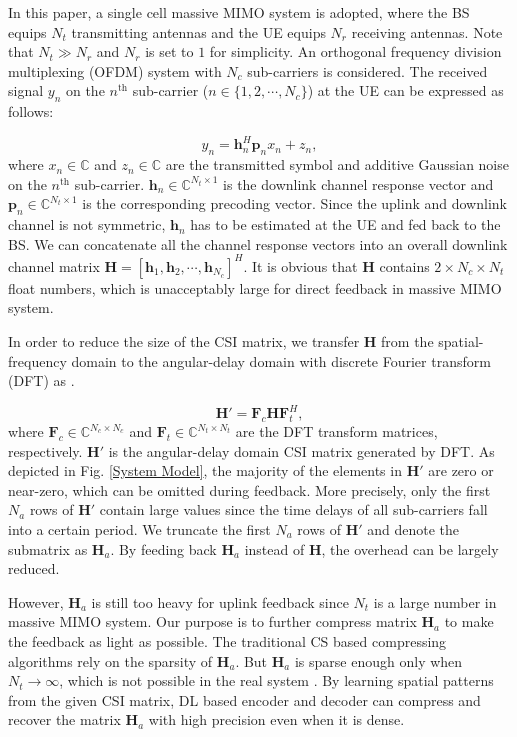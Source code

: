 \documentclass[12pt, draftclsnofoot, onecolumn]{IEEEtran}
\begin{document}
In this paper, a single cell massive MIMO system is adopted, where the BS equips $N_t$ transmitting antennas and the UE equips $N_r$ receiving antennas. Note that $N_t \gg N_r$ and $N_r$ is set to $1$ for simplicity. An orthogonal frequency division multiplexing (OFDM) system with $N_c$ sub-carriers is considered. The received signal $y_n$ on the $n^\text{th}$ sub-carrier ($n \in \{1, 2, \cdots, N_c\}$) at the UE can be expressed as follows:

\begin{equation}
    y_n = \textbf{h}_n^H\mathbf{p}_nx_n+z_n,
\end{equation}
where $x_n \in \mathbb{C}$ and $z_n \in \mathbb{C}$ are the transmitted symbol and additive Gaussian noise on the $n^\text{th}$ sub-carrier. $\mathbf{h}_n \in \mathbb{C}^{N_t\times 1}$ is the downlink channel response vector and $\mathbf{p}_n \in \mathbb{C}^{N_t\times 1}$ is the corresponding precoding vector. Since the uplink and downlink channel is not symmetric, $\mathbf{h}_n$ has to be estimated at the UE and fed back to the BS. We can concatenate all the channel response vectors into an overall downlink channel matrix $\mathbf{H}=[\mathbf{h}_1, \mathbf{h}_2, \cdots, \mathbf{h}_{N_c}]^H$. It is obvious that $\mathbf{H}$ contains $2\times N_c \times N_t$ float numbers, which is unacceptably large for direct feedback in massive MIMO system.

In order to reduce the size of the CSI matrix, we transfer $\mathbf{H}$ from the spatial-frequency domain to the angular-delay domain with discrete Fourier transform (DFT) as \cite{lu2020multi}.

\begin{equation} \label{eq2}
    \mathbf{H}' = \mathbf{F}_c\mathbf{H}\mathbf{F}_t^H,
\end{equation}
where $\mathbf{F}_c \in \mathbb{C}^{N_c\times N_c}$ and $\mathbf{F}_t \in \mathbb{C}^{N_t \times N_t}$ are the DFT transform matrices, respectively. $\mathbf{H}'$ is the angular-delay domain CSI matrix generated by DFT. As depicted in Fig. \ref{System Model}, the majority of the elements in $\mathbf{H}'$ are zero or near-zero, which can be omitted during feedback. More precisely, only the first $N_a$ rows of $\mathbf{H}'$ contain large values since the time delays of all sub-carriers fall into a certain period. We truncate the first $N_a$ rows of $\mathbf{H}'$ and denote the submatrix as $\mathbf{H}_a$. By feeding back $\mathbf{H}_a$ instead of $\mathbf{H}$, the overhead can be largely reduced.

However, $\mathbf{H}_a$ is still too heavy for uplink feedback since $N_t$ is a large number in massive MIMO system. Our purpose is to further compress matrix $\mathbf{H}_a$ to make the feedback as light as possible. The traditional CS based compressing algorithms rely on the sparsity of $\mathbf{H}_a$. But $\mathbf{H}_a$ is sparse enough only when $N_t \to\infty$, which is not possible in the real system \cite{wen2014channel}. By learning spatial patterns from the given CSI matrix, DL based encoder and decoder can compress and recover the matrix $\mathbf{H}_a$ with high precision even when it is dense.
\end{document}
